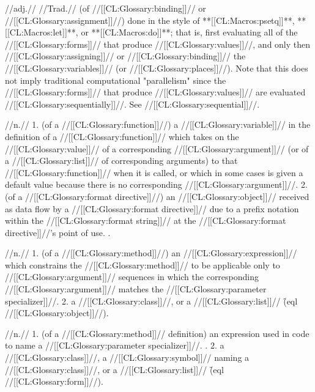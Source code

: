  //adj.// //Trad.// (of //[[CL:Glossary:binding]]// or //[[CL:Glossary:assignment]]//) done in the style of **[[CL:Macros:psetq]]**, **[[CL:Macros:let]]**, or **[[CL:Macros:do]]**; that is, first evaluating all of the //[[CL:Glossary:forms]]// that produce //[[CL:Glossary:values]]//, and only then //[[CL:Glossary:assigning]]// or //[[CL:Glossary:binding]]// the //[[CL:Glossary:variables]]// (or //[[CL:Glossary:places]]//). Note that this does not imply traditional computational "parallelism" since the //[[CL:Glossary:forms]]// that produce //[[CL:Glossary:values]]// are evaluated //[[CL:Glossary:sequentially]]//. See //[[CL:Glossary:sequential]]//.

 //n.// 1. (of a //[[CL:Glossary:function]]//) a //[[CL:Glossary:variable]]// in the definition of a //[[CL:Glossary:function]]// which takes on the //[[CL:Glossary:value]]// of a corresponding //[[CL:Glossary:argument]]// (or of a //[[CL:Glossary:list]]// of corresponding arguments) to that //[[CL:Glossary:function]]// when it is called, or which in some cases is given a default value because there is no corresponding //[[CL:Glossary:argument]]//. 2. (of a //[[CL:Glossary:format directive]]//) an //[[CL:Glossary:object]]// received as data flow by a //[[CL:Glossary:format directive]]// due to a prefix notation within the //[[CL:Glossary:format string]]// at the //[[CL:Glossary:format directive]]//'s point of use. \Seesection\FormattedOutput. 

 //n.// 1. (of a //[[CL:Glossary:method]]//) an //[[CL:Glossary:expression]]// which constrains the //[[CL:Glossary:method]]// to be applicable only to //[[CL:Glossary:argument]]// sequences in which the corresponding //[[CL:Glossary:argument]]// matches the //[[CL:Glossary:parameter specializer]]//. 2. a //[[CL:Glossary:class]]//, or a //[[CL:Glossary:list]]// \f{(eql //[[CL:Glossary:object]]//)}.

 //n.// 1. (of a //[[CL:Glossary:method]]// definition) an expression used in code to name a //[[CL:Glossary:parameter specializer]]//. \Seesection\IntroToMethods. 2. a //[[CL:Glossary:class]]//,
 a //[[CL:Glossary:symbol]]// naming a //[[CL:Glossary:class]]//, or a //[[CL:Glossary:list]]// \f{(eql //[[CL:Glossary:form]]//)}.

